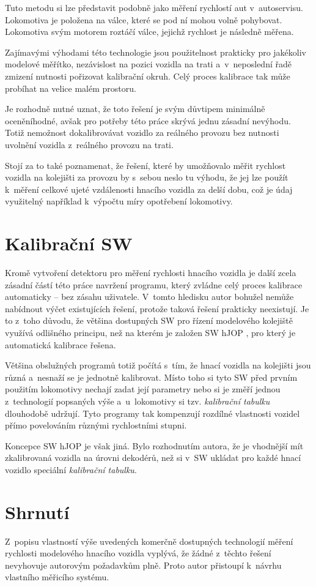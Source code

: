 Tuto metodu si lze představit podobně jako měření rychlostí aut v~autoservisu.
Lokomotiva je položena na válce, které se pod ní mohou volně pohybovat.
Lokomotiva svým motorem roztáčí válce, jejichž rychlost je následně měřena.

Zajímavými výhodami této technologie jsou použitelnost prakticky pro jakékoliv
modelové měřítko, nezávislost na pozici vozidla na trati a~v~neposlední řadě
zmizení nutnosti pořizovat kalibrační okruh. Celý proces kalibrace tak může
probíhat na velice malém prostoru.

Je rozhodně nutné uznat, že toto řešení je svým důvtipem minimálně oceněníhodné,
avšak pro potřeby této práce skrývá jednu zásadní nevýhodu. Totiž nemožnost
dokalibrovávat vozidlo za reálného provozu bez nutnosti uvolnění vozidla
z~reálného provozu na trati.

Stojí za to také poznamenat, že řešení, které by umožňovalo měřit rychlost
vozidla na kolejišti za provozu by s~sebou neslo tu výhodu, že jej lze použít
k~měření celkové ujeté vzdálenosti hnacího vozidla za delší dobu, což je údaj
využitelný například k~výpočtu míry opotřebení lokomotivy.

\section{Kalibrační SW}
\label{sec:kalib-sw}

Kromě vytvoření detektoru pro měření rychlosti hnacího vozidla je další zcela
zásadní částí této práce navržení programu, který zvládne celý proces
kalibrace automaticky -- bez zásahu uživatele. V~tomto hledisku autor bohužel
nemůže nabídnout výčet existujících řešení, protože taková řešení
prakticky neexistují. Je to z~toho důvodu, že většina dostupných SW pro řízení
modelového kolejiště využívá odlišného principu, než na kterém je založen SW
hJOP \cite{hjop:web}, pro který je automatická kalibrace řešena.

Většina obslužných programů totiž počítá s~tím, že hnací vozidla na kolejišti
jsou různá a~nesnaží se je jednotně kalibrovat. Místo toho si tyto SW před
prvním použitím lokomotivy nechají zadat její parametry nebo si je změří jednou
z~technologií popsaných výše a~u~lokomotivy si tzv. \textit{kalibrační tabulku}
dlouhodobě udržují. Tyto programy tak kompenzují rozdílné vlastnosti vozidel přímo
povelováním různými rychlostními stupni.

Koncepce SW hJOP je však jiná. Bylo rozhodnutím autora, že je vhodnější mít
zkalibrovaná vozidla na úrovni dekodérů, než si v~SW ukládat pro každé hnací
vozidlo speciální \textit{kalibrační tabulku}.

\section{Shrnutí}
\label{sec:prehled-zaver}

Z~popisu vlastností výše uvedených komerčně dostupných technologií měření
rychlosti modelového hnacího vozidla vyplývá, že žádné z~těchto řešení
nevyhovuje autorovým požadavkům plně. Proto autor přistoupí k~návrhu vlastního
měřicího systému.
